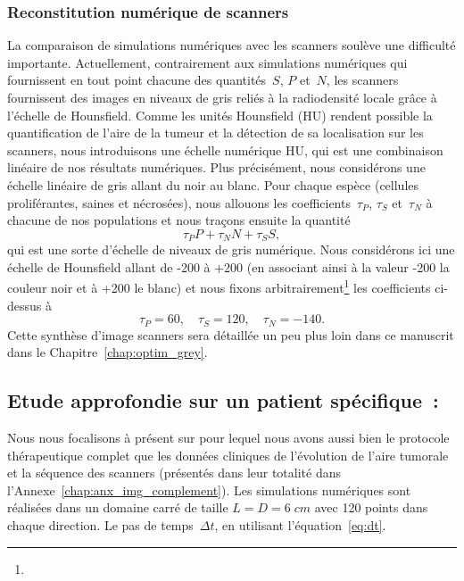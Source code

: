 \documentclass[main.tex]{subfiles}
\begin{document}
\subsubsection{Reconstitution numérique de scanners}

La comparaison de simulations numériques 
avec les scanners soulève une difficulté importante. 
Actuellement, contrairement aux simulations numériques qui fournissent en tout point chacune des quantités~$S$, $P$ et~$N$, les scanners fournissent des images en niveaux de gris reliés à la radiodensité locale grâce à l'échelle de 
Hounsfield. Comme les unités Hounsfield (HU) rendent possible la quantification de 
l'aire de la tumeur et la détection de sa localisation sur les scanners, nous introduisons une échelle numérique HU, qui est une combinaison linéaire de nos résultats numériques. 
Plus précisément, nous considérons une échelle linéaire de gris allant du noir au blanc. Pour chaque espèce (cellules proliférantes, saines et nécrosées), nous allouons les 
coefficients~$\tau_P$, $\tau_S$ et~$\tau_N$ à chacune de nos populations   et nous traçons ensuite la quantité
\begin{equation}\label{eq:grey_level}
\tau_P P + \tau_N N + \tau_S S,
\end{equation}
qui est une sorte d'échelle de niveaux de gris numérique. 
Nous considérons ici une échelle de Hounsfield allant de 
-200 à +200 (en associant ainsi à la valeur -200 la couleur noir et à +200 le blanc) et nous fixons arbitrairement\footnote{} les coefficients ci-dessus à 
\begin{equation}\label{eq:tau_arbitraire}
\tau_P=60,\quad \tau_S=120,\quad \tau_N=-140.
\end{equation}
Cette synthèse d'image scanners sera détaillée un peu plus loin dans ce manuscrit dans le Chapitre~\ref{chap:optim_grey}.


\subsection{Etude approfondie sur un patient spécifique~: \Nber}

Nous nous focalisons à présent sur \Nber pour lequel nous avons aussi bien le protocole thérapeutique complet que les données cliniques de l'évolution de l'aire tumorale et la séquence des scanners (présentés dans leur totalité dans l'Annexe~\ref{chap:anx_img_complement}). 
Les simulations numériques sont réalisées dans un domaine carré de taille 
$L=D=6\;cm$ avec 120 points dans chaque direction. 
Le pas de temps~$\Delta t$,  en utilisant l'équation~\eqref{eq:dt}. 
\end{document}
